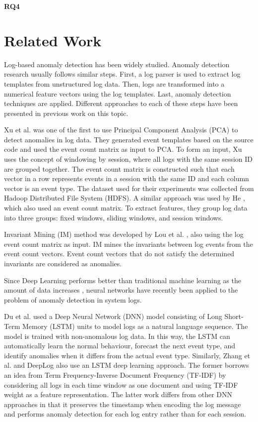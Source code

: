 \textbf{RQ4} \textit{\RQFourth}\\ 
    


\section{Related Work}
Log-based anomaly detection has been widely studied. Anomaly detection research usually follows similar steps. First, a log parser is used to extract log templates from unstructured log data. Then, logs are transformed into a numerical feature vectors using the log templates. Last, anomaly detection techniques are applied.
Different approaches to each of these steps have been presented in previous work on this topic. 

Xu et al. \cite{xu2009} was one of the first to use Principal Component Analysis (PCA) to detect anomalies in log data. They generated event templates based on the source code and used the event count matrix as input to PCA. To form an input, Xu uses the concept of windowing by session, where all logs with the same session ID are grouped together. The event count matrix is constructed such that each vector in a row represents events in a session with the same ID and each column vector is an event type. The dataset used for their experiments was collected from Hadoop Distributed File System (HDFS).
A similar approach was used by He \cite{he2016}, which also used an event count matrix. To extract features, they group log data into three groups: fixed windows, sliding windows, and session windows. 

Invariant Mining (IM) method was developed by Lou et al. \cite{lou2010}, also using the log event count matrix as input. IM mines the invariants between log events from the event count vectors. Event count vectors that do not satisfy the determined invariants are considered as anomalies. 

Since Deep Learning performs better than traditional machine learning as the amount of data increases \cite{Sydney2019DeepLF}, neural networks have recently been applied to the problem of anomaly detection in system logs. 

Du et al. \cite{deeplog2017} used a Deep Neural Network (DNN) model consisting of Long Short-Term Memory (LSTM) units to model logs as a natural language sequence. The model is trained with non-anomalous log data. In this way, the LSTM can automatically learn the normal behaviour, forecast the next event type, and identify anomalies when it differs from the actual event type. Similarly, Zhang et al. \cite{zhang2016} and DeepLog \cite{deeplog2017} also use an LSTM deep learning approach. The former borrows an idea from Term Frequency-Inverse Document Frequency (TF-IDF) by considering all logs in each time window as one document and using TF-IDF weight as a feature representation. The latter work differs from other DNN approaches in that it preserves the timestamp when encoding the log message and performs anomaly detection for each log entry rather than for each session.

